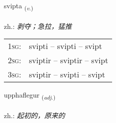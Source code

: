 \documentclass[frontgrid, backgrid]{flacards}\usepackage[]{graphicx}\usepackage[]{xcolor}
\begin{document}
\renewcommand{\flhead}{\vskip5pt \fboxsep=0pt {\small\bfseries\footnotesize Sagnorð | 动词}}
\renewcommand{\fcfoot}{\vskip5pt \fboxsep=0pt \hspace{2pt}{\small\bfseries\footnotesize 3K}}

\renewcommand{\blhead}{\vskip5pt {\small\bfseries\footnotesize Sagnorð | 动词 }}
\renewcommand{\bcfoot}{\vskip5pt \hspace{2pt}{\small\bfseries\footnotesize 3K}}


{svipta \small{\textsubscript{(\textit{v.})}} \\[1ex] %
\textphonetic{[svɪfta]} \\
zh.: \emph{剥夺；急拉，猛推} \\  [2ex]
\renewcommand*{\arraystretch}{0.8}
\begin{tabular}{p{1cm}l}
\textsc{1sg}: & svipti -- svipti -- svipt \\ 
\textsc{2sg}: & sviptir -- sviptir -- svipt \\ 
\textsc{3sg}: & sviptir -- svipti -- svipt \\ 
\end{tabular}
}

\renewcommand{\flhead}{\vskip5pt \fboxsep=0pt {\small\bfseries\footnotesize Lýsingarorð | 形容词}}
\renewcommand{\fcfoot}{\vskip5pt \fboxsep=0pt \hspace{2pt}{\small\bfseries\footnotesize 3K}}

\renewcommand{\blhead}{\vskip5pt {\small\bfseries\footnotesize Lýsingarorð | 形容词 }}
\renewcommand{\bcfoot}{\vskip5pt \hspace{2pt}{\small\bfseries\footnotesize 3K}}


{upphaflegur \small{\textsubscript{(\textit{adj.})}} \\[1ex] %
\textphonetic{[ʏhphavlɛɣʏr]} \\
zh.: \emph{起初的，原来的} \\  [2ex]
\renewcommand*{\arraystretch}{0.8}
}
\end{document}
